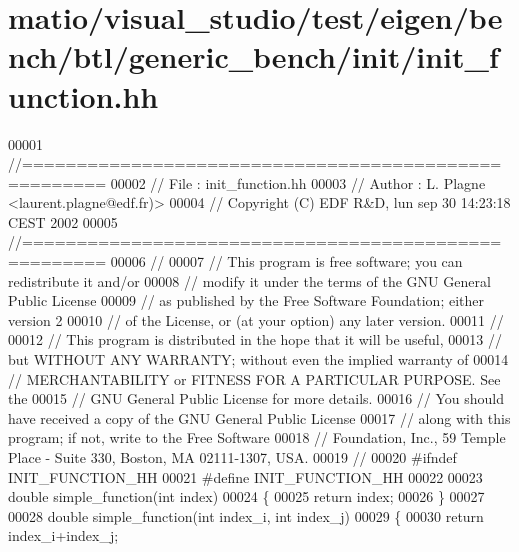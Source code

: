 \hypertarget{matio_2visual__studio_2test_2eigen_2bench_2btl_2generic__bench_2init_2init__function_8hh_source}{}\section{matio/visual\+\_\+studio/test/eigen/bench/btl/generic\+\_\+bench/init/init\+\_\+function.hh}
\label{matio_2visual__studio_2test_2eigen_2bench_2btl_2generic__bench_2init_2init__function_8hh_source}

\begin{DoxyCode}
00001 \textcolor{comment}{//=====================================================}
00002 \textcolor{comment}{// File   :  init\_function.hh}
00003 \textcolor{comment}{// Author :  L. Plagne <laurent.plagne@edf.fr)>        }
00004 \textcolor{comment}{// Copyright (C) EDF R&D,  lun sep 30 14:23:18 CEST 2002}
00005 \textcolor{comment}{//=====================================================}
00006 \textcolor{comment}{// }
00007 \textcolor{comment}{// This program is free software; you can redistribute it and/or}
00008 \textcolor{comment}{// modify it under the terms of the GNU General Public License}
00009 \textcolor{comment}{// as published by the Free Software Foundation; either version 2}
00010 \textcolor{comment}{// of the License, or (at your option) any later version.}
00011 \textcolor{comment}{// }
00012 \textcolor{comment}{// This program is distributed in the hope that it will be useful,}
00013 \textcolor{comment}{// but WITHOUT ANY WARRANTY; without even the implied warranty of}
00014 \textcolor{comment}{// MERCHANTABILITY or FITNESS FOR A PARTICULAR PURPOSE.  See the}
00015 \textcolor{comment}{// GNU General Public License for more details.}
00016 \textcolor{comment}{// You should have received a copy of the GNU General Public License}
00017 \textcolor{comment}{// along with this program; if not, write to the Free Software}
00018 \textcolor{comment}{// Foundation, Inc., 59 Temple Place - Suite 330, Boston, MA  02111-1307, USA.}
00019 \textcolor{comment}{// }
00020 \textcolor{preprocessor}{#ifndef INIT\_FUNCTION\_HH}
00021 \textcolor{preprocessor}{#define INIT\_FUNCTION\_HH}
00022 
00023 \textcolor{keywordtype}{double} simple\_function(\textcolor{keywordtype}{int} index)
00024 \{
00025   \textcolor{keywordflow}{return} index;
00026 \}
00027 
00028 \textcolor{keywordtype}{double} simple\_function(\textcolor{keywordtype}{int} index\_i, \textcolor{keywordtype}{int} index\_j)
00029 \{
00030   \textcolor{keywordflow}{return} index\_i+index\_j;

\end{DoxyCode}
